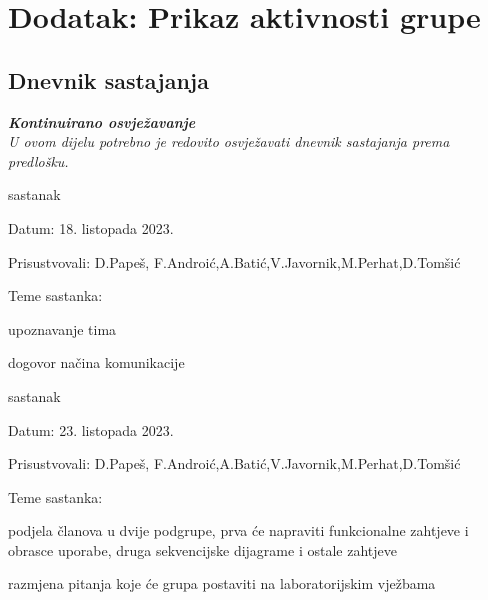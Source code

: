\chapter*{Dodatak: Prikaz aktivnosti grupe}
		
		\section*{Dnevnik sastajanja}
		
		\textbf{\textit{Kontinuirano osvježavanje}}\\
		
		 \textit{U ovom dijelu potrebno je redovito osvježavati dnevnik sastajanja prema predlošku.}
		
		\begin{packed_enum}
			\item  sastanak
			
			\item[] \begin{packed_item}
				\item Datum: 18. listopada 2023.
				\item Prisustvovali: D.Papeš, F.Androić,A.Batić,V.Javornik,M.Perhat,D.Tomšić
				\item Teme sastanka:
				\begin{packed_item}
					\item  upoznavanje tima
					\item  dogovor načina komunikacije
				\end{packed_item}
			\end{packed_item}
			
			\item  sastanak
			\item[] \begin{packed_item}
				\item Datum: 23. listopada 2023.
				\item Prisustvovali: D.Papeš, F.Androić,A.Batić,V.Javornik,M.Perhat,D.Tomšić
				\item Teme sastanka:
				\begin{packed_item}
					\item  podjela članova u dvije podgrupe, prva će napraviti funkcionalne zahtjeve i obrasce uporabe, druga sekvencijske dijagrame i ostale zahtjeve
					\item  razmjena pitanja koje će grupa postaviti na laboratorijskim vježbama
				\end{packed_item}
			\end{packed_item}
			
			
		\end{packed_enum}
		
